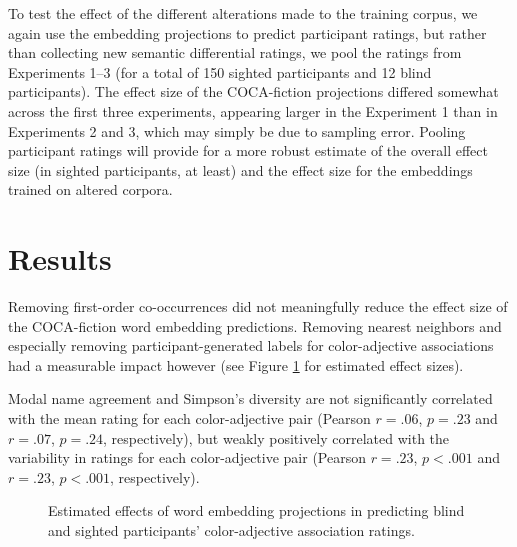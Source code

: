 \documentclass[10pt,letterpaper]{article}
\begin{document}
To test the effect of the different alterations made to the training corpus, we again use the embedding projections to predict participant ratings, but rather than collecting new semantic differential ratings, we pool the ratings from Experiments 1--3 (for a total of 150 sighted participants and 12 blind participants). The effect size of the COCA-fiction projections differed somewhat across the first three experiments, appearing larger in the Experiment 1 than in Experiments 2 and 3, which may simply be due to sampling error. Pooling participant ratings will provide for a more robust estimate of the overall effect size (in sighted participants, at least) and the effect size for the embeddings trained on altered corpora.

\section{Results}
Removing first-order co-occurrences did not meaningfully reduce the effect size of the COCA-fiction word embedding predictions. Removing nearest neighbors and especially removing participant-generated labels for color-adjective associations had a measurable impact however (see Figure \ref{corpus_modification} for estimated effect sizes).

Modal name agreement and Simpson's diversity are not significantly correlated with the mean rating for each color-adjective pair (Pearson $r = .06$, $p = .23$ and $r = .07$, $p = .24$, respectively), but weakly positively correlated with the variability in ratings for each color-adjective pair (Pearson $r = .23$, $p < .001$ and $r = .23$, $p < .001$, respectively).

\begin{figure}[ht!]
\begin{center}
\caption{Estimated effects of word embedding projections in predicting blind and sighted participants' color-adjective association ratings.}
\label{corpus_modification}
\end{center}
\end{figure}
\end{document}
